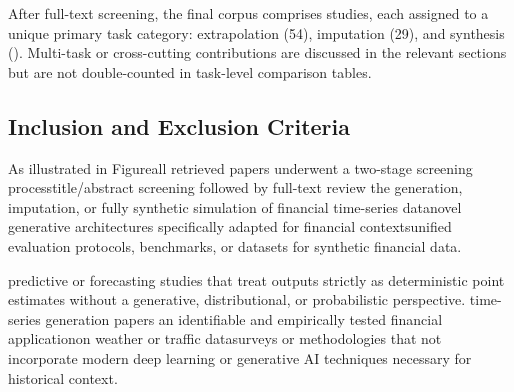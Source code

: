 After full-text screening, the final corpus comprises studies, each assigned to a unique primary task category: extrapolation (54), imputation (29), and synthesis (). Multi-task or cross-cutting contributions are discussed in the relevant sections but are not double-counted in task-level comparison tables.

\subsection{Inclusion and Exclusion Criteria}
As illustrated in Figure\revadddec{~\ref{fig:lit_dist}, }all retrieved papers underwent a two-stage screening process\revdeldec{ (}title/abstract screening followed by full-text review the generation, imputation, or fully synthetic simulation of financial time-series datanovel generative architectures specifically adapted for financial contextsunified evaluation protocols, benchmarks, or datasets for synthetic financial data.

predictive or forecasting studies that treat outputs strictly as deterministic point estimates without a generative, distributional, or probabilistic perspective. time-series generation papers an identifiable and empirically tested financial applicationon weather or traffic datasurveys or methodologies that not incorporate modern deep learning or generative AI techniques necessary for historical context.

